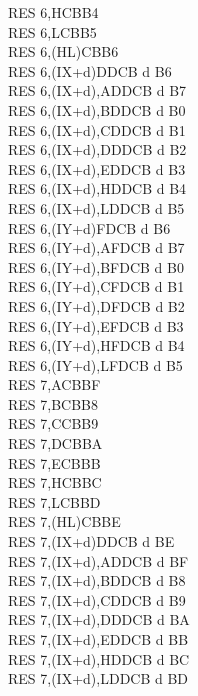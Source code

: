\begin{multicols}{3}
{\begin{tabbing}
        RES 6,H\>CBB4\\
        RES 6,L\>CBB5\\
        RES 6,(HL)\>CBB6\\
        RES 6,(IX+d)\>DDCB d B6\\
        RES 6,(IX+d),A\UNDOC\>DDCB d B7\\
        RES 6,(IX+d),B\UNDOC\>DDCB d B0\\
        RES 6,(IX+d),C\UNDOC\>DDCB d B1\\
        RES 6,(IX+d),D\UNDOC\>DDCB d B2\\
        RES 6,(IX+d),E\UNDOC\>DDCB d B3\\
        RES 6,(IX+d),H\UNDOC\>DDCB d B4\\
        RES 6,(IX+d),L\UNDOC\>DDCB d B5\\
        RES 6,(IY+d)\>FDCB d B6\\
        RES 6,(IY+d),A\UNDOC\>FDCB d B7\\
        RES 6,(IY+d),B\UNDOC\>FDCB d B0\\
        RES 6,(IY+d),C\UNDOC\>FDCB d B1\\
        RES 6,(IY+d),D\UNDOC\>FDCB d B2\\
        RES 6,(IY+d),E\UNDOC\>FDCB d B3\\
        RES 6,(IY+d),H\UNDOC\>FDCB d B4\\
        RES 6,(IY+d),L\UNDOC\>FDCB d B5\\
        RES 7,A\>CBBF\\
        RES 7,B\>CBB8\\
        RES 7,C\>CBB9\\
        RES 7,D\>CBBA\\
        RES 7,E\>CBBB\\
        RES 7,H\>CBBC\\
        RES 7,L\>CBBD\\
        RES 7,(HL)\>CBBE\\
        RES 7,(IX+d)\>DDCB d BE\\
        RES 7,(IX+d),A\UNDOC\>DDCB d BF\\
        RES 7,(IX+d),B\UNDOC\>DDCB d B8\\
        RES 7,(IX+d),C\UNDOC\>DDCB d B9\\
        RES 7,(IX+d),D\UNDOC\>DDCB d BA\\
        RES 7,(IX+d),E\UNDOC\>DDCB d BB\\
        RES 7,(IX+d),H\UNDOC\>DDCB d BC\\
        RES 7,(IX+d),L\UNDOC\>DDCB d BD\\

\end{tabbing}}
\end{multicols}
